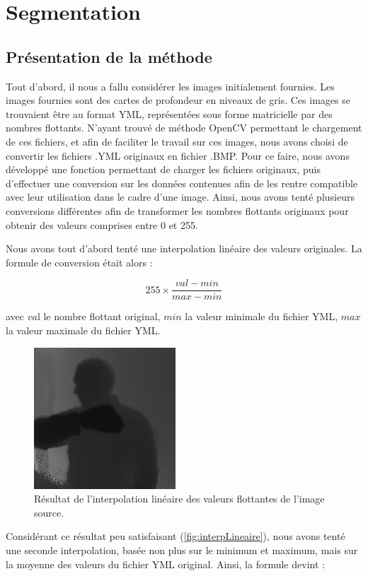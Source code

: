 \section{Segmentation}
\subsection{Présentation de la méthode}
Tout d'abord, il nous a fallu considérer les images initialement fournies. Les images fournies sont des cartes de profondeur en niveaux de gris. Ces images se trouvaient être au format YML, représentées sous forme matricielle par des nombres flottants. N'ayant trouvé de méthode OpenCV permettant le chargement de ces fichiers, et afin de faciliter le travail sur ces images, nous avons choisi de convertir les fichiers .YML originaux en fichier .BMP. Pour ce faire, nous avons développé une fonction permettant de charger les fichiers originaux, puis d'effectuer une conversion sur les données contenues afin de les rentre compatible avec leur utilisation dans le cadre d'une image. Ainsi, nous avons tenté plusieurs conversions différentes afin de transformer les nombres flottants originaux pour obtenir des valeurs comprises entre 0 et 255. 

Nous avons tout d'abord tenté une interpolation linéaire des valeurs originales. La formule de conversion était alors :

\[
255 \times \frac{val - min}{max - min}
\]

avec $va$l le nombre flottant original, $min$ la valeur minimale du fichier YML, $max$ la valeur maximale du fichier YML.

\begin{figure}[htb!]
\centerline{\includegraphics{interpLineaire.png}}
\caption{Résultat de l'interpolation linéaire des valeurs flottantes de l'image source.}
\label{fig:interpLineaire}
\end{figure}

Considérant ce résultat peu satisfaisant (\autoref{fig:interpLineaire}), nous avons tenté une seconde interpolation, basée non plus sur le minimum et maximum, mais sur la moyenne des valeurs du fichier YML original. Ainsi, la formule devint :

